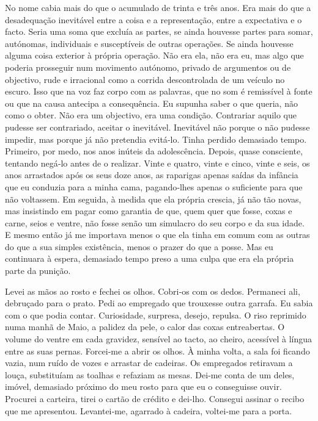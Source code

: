 No nome cabia mais do que o acumulado de trinta e três anos. Era mais do
que a desadequação inevitável entre a coisa e a representação, entre a
expectativa e o facto. Seria uma soma que excluía as partes, se ainda
houvesse partes para somar, autónomas, individuais e susceptíveis de
outras operações. Se ainda houvesse alguma coisa exterior à própria
operação. Não era ela, não era eu, mas algo que poderia prosseguir num
movimento autónomo, privado de argumentos ou de objectivo, rude e
irracional como a corrida descontrolada de um veículo no escuro. Isso
que na voz faz corpo com as palavras, que no som é remissível à fonte ou
que na causa antecipa a consequência. Eu supunha saber o que queria, não
como o obter. Não era um objectivo, era uma condição. Contrariar aquilo
que pudesse ser contrariado, aceitar o inevitável. Inevitável não porque
o não pudesse impedir, mas porque já não pretendia evitá­‑lo. Tinha
perdido demasiado tempo. Primeiro, por medo, nos anos inúteis da
adolescência. Depois, quase consciente, tentando negá­‑lo antes de o
realizar. Vinte e quatro, vinte e cinco, vinte e seis, os anos
arrastados após os seus doze anos, as raparigas apenas saídas da
infância que eu conduzia para a minha cama, pagando­‑lhes apenas o
suficiente para que não voltassem. Em seguida, à medida que ela própria
crescia, já não tão novas, mas insistindo em pagar como garantia de que,
quem quer que fosse, coxas e carne, seios e ventre, não fosse senão um
simulacro do seu corpo e da sua idade. E mesmo então já me importava
menos o que ela tinha em comum com as outras do que a sua simples
existência, menos o prazer do que a posse. Mas eu continuara à espera,
demasiado tempo preso a uma culpa que era ela própria parte da punição.

Levei as mãos ao rosto e fechei os olhos. Cobri­‑os com os dedos.
Permaneci ali, debruçado para o prato. Pedi ao empregado que trouxesse
outra garrafa. Eu sabia com o que podia contar. Curiosidade, surpresa,
desejo, repulsa. O riso reprimido numa manhã de Maio, a palidez da pele,
o calor das coxas entreabertas. O volume do ventre em cada gravidez,
sensível ao tacto, ao cheiro, acessível à língua entre as suas pernas.
Forcei­‑me a abrir os olhos. À minha volta, a sala foi ficando vazia,
num ruído de vozes e arrastar de cadeiras. Os empregados retiravam a
louça, substituíam as toalhas e refaziam as mesas. Dei­‑me conta de um
deles, imóvel, demasiado próximo do meu rosto para que eu o conseguisse
ouvir. Procurei a carteira, tirei o cartão de crédito e dei­‑lho.
Consegui assinar o recibo que me apresentou. Levantei­‑me, agarrado à
cadeira, voltei­‑me para a porta.


